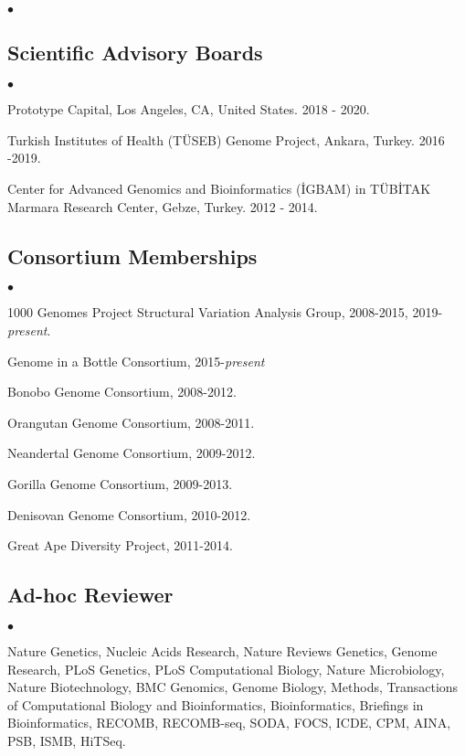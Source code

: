 \documentclass[margin,line]{res}
\newenvironment{list2}{
  \begin{list}{$\bullet$}{%
      \setlength{\itemsep}{0.1cm}
      \setlength{\parsep}{0in} \setlength{\parskip}{0in}
      \setlength{\topsep}{0in} \setlength{\partopsep}{0in} 
      \setlength{\leftmargin}{0.2in}}}{\end{list}}
\begin{document}
\begin{resume}
\begin{list2}
\end{list2}

\vspace{-0.4cm}
\subsection{\small \sc Scientific Advisory Boards}
\begin{list2}
\item
  Prototype Capital, Los Angeles, CA, United States. 2018 - 2020.
\item
  Turkish Institutes of Health (TÜSEB) Genome Project, Ankara, Turkey. 2016 -2019.
\item
  Center for Advanced Genomics and Bioinformatics (\.{I}GBAM)
  in T\"{U}B\.{I}TAK Marmara Research Center, Gebze, Turkey. 2012 - 2014.
\end{list2}

\vspace{-0.4cm}
\subsection{\small \sc Consortium Memberships}

\begin{list2}
\item
  1000 Genomes Project Structural Variation Analysis Group, 2008-2015, 2019-\textit{present}.
  \item
  Genome in a Bottle Consortium, 2015-{\it present}
\item
  Bonobo Genome Consortium, 2008-2012.
\item
  Orangutan Genome Consortium, 2008-2011.
\item
  Neandertal Genome Consortium, 2009-2012.
\item
  Gorilla Genome Consortium, 2009-2013.
\item
  Denisovan Genome Consortium, 2010-2012.
\item
  Great Ape Diversity Project, 2011-2014.
\end{list2}


\vspace{-0.4cm}
\subsection{\small \sc Ad-hoc Reviewer}
\begin{list2}
\item
  Nature Genetics, Nucleic Acids Research, Nature Reviews Genetics, Genome Research, PLoS Genetics, PLoS Computational Biology, Nature Microbiology,
  Nature Biotechnology, BMC Genomics, Genome Biology, Methods, Transactions of Computational Biology and Bioinformatics,
  Bioinformatics, Briefings in Bioinformatics, RECOMB, RECOMB-seq, SODA, FOCS, ICDE, CPM, AINA, PSB, ISMB, HiTSeq.
\end{list2}


\end{resume}
\end{document}
